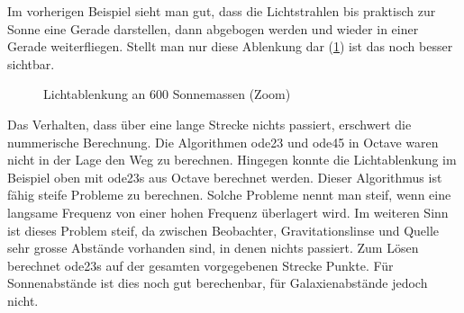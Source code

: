 \begin{refsection}
Im vorherigen Beispiel sieht man gut, dass die Lichtstrahlen bis
praktisch zur Sonne eine Gerade darstellen, dann abgebogen werden und
wieder in einer Gerade weiterfliegen.  Stellt man nur diese Ablenkung
dar (\ref{fig:lichtablenkung600SonneZoom}) ist das noch besser
sichtbar.

\begin{figure}
  \centering
  \caption{Lichtablenkung an 600 Sonnemassen (Zoom)}
  \label{fig:lichtablenkung600SonneZoom}
\end{figure}

Das Verhalten, dass über eine lange Strecke nichts passiert, erschwert
die nummerische Berechnung.  Die Algorithmen ode23 und ode45 in Octave
waren nicht in der Lage den Weg zu berechnen.  Hingegen konnte die
Lichtablenkung im Beispiel oben mit ode23s aus Octave berechnet
werden.  Dieser Algorithmus ist fähig steife Probleme zu berechnen.
Solche Probleme nennt man steif, wenn eine langsame Frequenz von einer
hohen Frequenz überlagert wird.  Im weiteren Sinn ist dieses Problem
steif, da zwischen Beobachter, Gravitationslinse und Quelle sehr
grosse Abstände vorhanden sind, in denen nichts passiert.  Zum Lösen
berechnet ode23s auf der gesamten vorgegebenen Strecke Punkte.  Für
Sonnenabstände ist dies noch gut berechenbar, für Galaxienabstände
jedoch nicht.


\printbibliography[heading=subbibliography]
\end{refsection}

